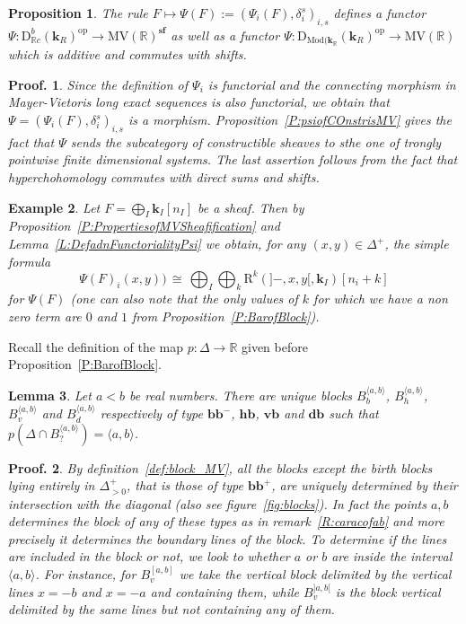 \documentclass[a4paper, english, 11pt]{article}
\newcommand{\kk}[0]{\textbf{k}}
\newcommand{\Mod}[0]{\text{Mod}}
\newcommand{\0}{\vec{0}}
\newcommand{\R}[0]{\mathbb{R}}
\newcommand{\D}[0]{\text{D}}
\newcommand{\op}[0]{\text{op}}
\newcommand{\Rr}[0]{\text{R}}
\newcommand{\MV}{\text{MV}}
\newcommand{\s}{\textbf{sf}}
\newtheorem{prop}{Proposition}[section]
\newtheorem*{pf}{Proof.} }
\newtheorem{ex}[prop]{Example}
\newtheorem{lem}[prop]{Lemma}
\begin{document}
\begin{prop}\label{P:PropertiesofPsi}
The rule $F\mapsto \Psi(F):= (\Psi_i(F), \delta_i^s)_{i,s}$ defines a functor $\Psi: \D^b_{\R c}(\kk_R)^{\op}\to \MV(\R)^\s$ as well as a functor 
$\Psi: \D_{\Mod(\kk_{\R}}(\kk_R)^{\op}\to \MV(\R)$
which is additive and commutes with shifts.
\end{prop}
\begin{pf} Since the definition of $\Psi_i$ is functorial  and the connecting morphism in Mayer-Vietoris long exact sequences is also functorial, we obtain  that $\Psi= (\Psi_i(F), \delta^s_i)_{i,s}$ is a morphism. Proposition~\ref{P:psiofCOnstrisMV} gives the fact that $\Psi$ sends the subcategory of constructible sheaves to sthe one of trongly pointwise finite dimensional systems.  The last assertion follows from the fact that hyperchohomology commutes with direct sums and shifts. 
\end{pf}
\begin{ex}\label{ex:ValueofPsiondirectsum}
 Let $F =\bigoplus_{I} \kk_I[n_I]$ be a sheaf. Then by Proposition~\ref{P:PropertiesofMVSheafification} and Lemma~\ref{L:DefadnFunctorialityPsi} we obtain, for any $(x,y)\in \Delta^+$, the simple formula 
 $$\Psi(F)_i (x,y) ) \, \cong \, \bigoplus_{I} \bigoplus_{k} \Rr^k\left(]-,x,y[, \kk_I\right)[n_i+k]$$ for $\Psi(F)$ (one can also note that the only values of $k$ for which we have a non zero term are $0$ and $1$ from Proposition~\ref{P:BarofBlock}).
\end{ex}



Recall the definition of the map $p: \Delta\to \R$ given before Proposition~\ref{P:BarofBlock}.
\begin{lem}\label{L:Blockassociatedtointerval}
 Let  $a<b$ be real numbers. There are unique  blocks $B_{b}^{\langle a, b\rangle}$, $B_{h}^{\langle a, b\rangle}$, $B_{v}^{\langle a, b\rangle}$ and $B_{d}^{\langle a, b\rangle}$ respectively of type $\textbf{bb}^{-}$, $\textbf{hb}$, $\textbf{vb}$ and $\textbf{db}$ such that $p(\Delta\cap B_{?}^{\langle a, b\rangle}) = \langle a,b \rangle$. 
\end{lem}
\begin{pf}
By definition~\ref{def:block_MV}, all the blocks except the birth blocks lying entirely in $\Delta^+_{>0}$, that is those of type $\textbf{bb}^{+}$,  are uniquely determined by their intersection with the diagonal (also see figure~\ref{fig:blocks}). In fact the points $a, b$ determines the block of any of these types as in remark~\ref{R:caracofab} and more precisely it determines the boundary lines of the block. To determine if the lines are included in the block or not, we look to whether $a$ or $b$ are inside the interval $\langle a, b\rangle$. For instance, for $B_v^{[a,b]}$ we take the vertical block delimited by the vertical lines $x=-b$ and $x=-a$ and containing them, while $B_v^{]a,b[}$ is the block vertical delimited by the same lines but not containing any of them. 
\end{pf}
\end{document}
